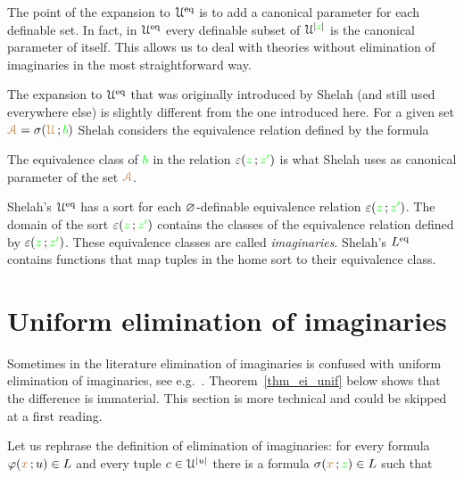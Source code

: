 \documentclass[creche.tex]{subfiles}
\begin{document}
The point of the expansion to $\EuScript U^{{\rm eq}}$ is to add a canonical parameter for each definable set.
In fact, in $\EuScript U^{{\rm eq}}$ every definable subset of $\EuScript U^{|{\color{green} z}|}$ is the canonical parameter of itself.
This allows us to deal with theories without elimination of imaginaries in the most straightforward way.

The expansion to $\EuScript U^{{\rm eq}}$ that was originally introduced by Shelah (and still used everywhere else) is slightly different from the one introduced here.
For a given set ${\color{brown}\EuScript A}=\sigma({\color{brown}\EuScript U}\,;{\color{green} b})$ Shelah considers the equivalence relation defined by the formula


The equivalence class of ${\color{green} b}$ in the relation $\varepsilon({\color{green} z}\,;{\color{green} z'})$ is what Shelah uses as canonical parameter of the set ${\color{brown}\EuScript A}$.

Shelah's $\EuScript U^{{\rm eq}}$ has a sort for each $\varnothing$-definable equivalence relation $\varepsilon({\color{green} z}\,;{\color{green} z'})$.
The domain of the sort $\varepsilon({\color{green} z}\,;{\color{green} z'})$ contains the classes of the equivalence relation defined by $\varepsilon({\color{green} z}\,;{\color{green} z'})$.
These equivalence classes are called \emph{imaginaries}.
Shelah's $L^{{\rm eq}}$ contains functions that map tuples in the home sort to their equivalence class.



\section{Uniform elimination of imaginaries}

\def\medrel#1{\parbox[t]{5ex}{$\displaystyle\hfil #1$}}
\def\ceq#1#2#3{\parbox[t]{35ex}{$\displaystyle #1$}\medrel{#2}{$\displaystyle #3$}}

Sometimes in the literature elimination of imaginaries is confused with uniform elimination of imaginaries, see e.g.~\cite[Definition 8.4.2]{TZ}.
Theorem~\ref{thm_ei_unif} below shows that the difference is immaterial.
This section is more technical and could be skipped at a first reading.

Let us rephrase the definition of elimination of imaginaries: for every formula $\varphi({\color{brown} x}\,;u)\in L$ and every tuple $c\in\EuScript U^{|u|}$ there is a formula $\sigma({\color{brown} x}\,;{\color{green} z})\in L$ such that
\end{document}
